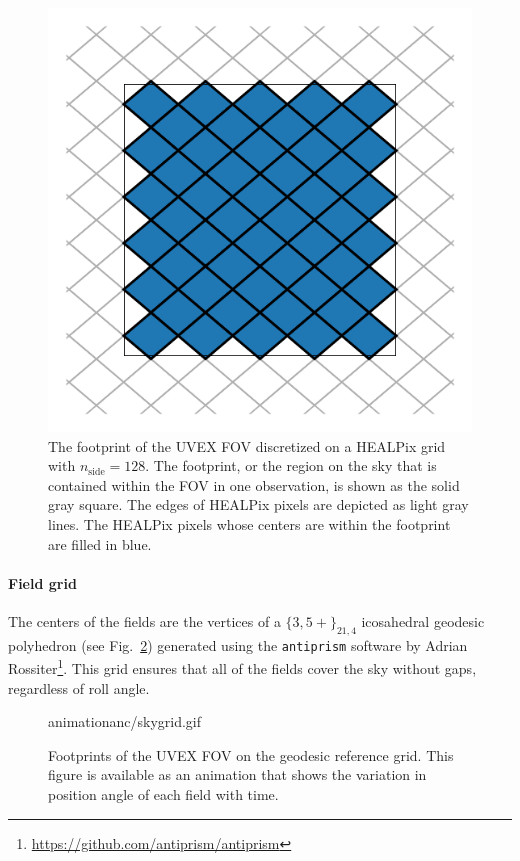 \documentclass[twocolumn,times]{aastex631}
\begin{document}
\begin{figure}
    \includegraphics[width=\columnwidth]{figures/fov}
    \caption{\label{fig:fov}The footprint of the \ac{UVEX} \ac{FOV} discretized on a \ac{HEALPix} grid with $n_\mathrm{side} = 128$. The footprint, or the region on the sky that is contained within the \ac{FOV} in one observation, is shown as the solid gray square. The edges of \ac{HEALPix} pixels are depicted as light gray lines. The HEALPix pixels whose centers are within the footprint are filled in blue.}
\end{figure}

\paragraph{Field grid}
The centers of the fields are the vertices of a $\{3,5+\}_{21,4}$ icosahedral geodesic polyhedron (see Fig.~\ref{fig:skygrid}) generated using the \texttt{antiprism} software by Adrian Rossiter\footnote{\url{https://github.com/antiprism/antiprism}}. This grid ensures that all of the fields cover the sky without gaps, regardless of roll angle.

\begin{figure}
    \begin{interactive}{animation}{anc/skygrid.gif}
    \end{interactive}
    \caption{\label{fig:skygrid}Footprints of the \ac{UVEX} \ac{FOV} on the geodesic reference grid. This figure is available as an animation that shows the variation in position angle of each field with time.}
\end{figure}
\end{document}

